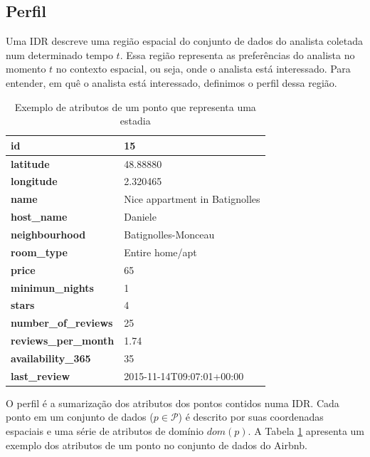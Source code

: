 \subsection{Perfil}

Uma IDR descreve uma região espacial do conjunto de dados do analista coletada num determinado tempo $t$. Essa região representa as preferências do analista no momento $t$ no contexto espacial, ou seja, onde o analista está interessado. Para entender, em quê o analista está interessado, definimos o perfil dessa região.

\begin{table}[]
	\centering
	\begin{tabular}{|l|l|}
		\hline
		\textbf{id}                  & 15                             \\ \hline
		\textbf{latitude}            & 48.88880                       \\ \hline
		\textbf{longitude}           & 2.320465                       \\ \hline
		\textbf{name}                & Nice appartment in Batignolles \\ \hline
		\textbf{host\_name}          & Daniele                        \\ \hline
		\textbf{neighbourhood}       & Batignolles-Monceau            \\ \hline
		\textbf{room\_type}          & Entire home/apt                \\ \hline
		\textbf{price}               & 65                             \\ \hline
		\textbf{minimun\_nights}     & 1                              \\ \hline
		\textbf{stars}               & 4                              \\ \hline
		\textbf{number\_of\_reviews} & 25                             \\ \hline
		\textbf{reviews\_per\_month} & 1.74                           \\ \hline
		\textbf{availability\_365}   & 35                             \\ \hline
		\textbf{last\_review}        & 2015-11-14T09:07:01+00:00      \\ \hline
	\end{tabular}
	\caption{Exemplo de atributos de um ponto que representa uma estadia}
	\label{table:atributos}
\end{table}

O perfil é a sumarização dos atributos dos pontos contidos numa IDR. Cada ponto em um conjunto de dados ($p \in \mathcal{P}$) é descrito por suas coordenadas espaciais e uma série de atributos de domínio $dom(p)$. A Tabela \ref{table:atributos} apresenta um exemplo dos atributos de um ponto no conjunto de dados do Airbnb.

